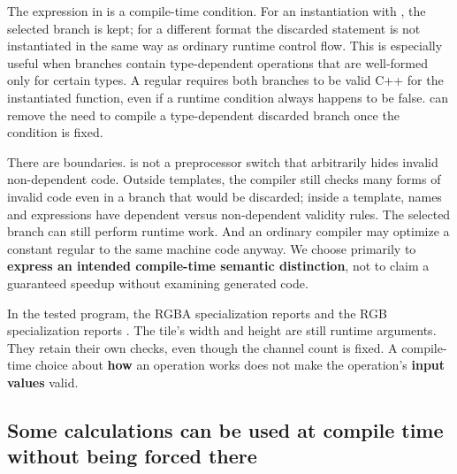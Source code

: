 The expression in  is a compile-time condition. For an instantiation with , the selected branch is kept; for a different format the discarded statement is not instantiated in the same way as ordinary runtime control flow. This is especially useful when branches contain type-dependent operations that are well-formed only for certain types. A regular  requires both branches to be valid C++ for the instantiated function, even if a runtime condition always happens to be false.  can remove the need to compile a type-dependent discarded branch once the condition is fixed.

There are boundaries.  is not a preprocessor switch that arbitrarily hides invalid non-dependent code. Outside templates, the compiler still checks many forms of invalid code even in a branch that would be discarded; inside a template, names and expressions have dependent versus non-dependent validity rules. The selected branch can still perform runtime work. And an ordinary compiler may optimize a constant regular  to the same machine code anyway. We choose  primarily to \textbf{express an intended compile-time semantic distinction}, not to claim a guaranteed speedup without examining generated code.

In the tested program, the RGBA specialization reports  and the RGB specialization reports . The tile's width and height are still runtime arguments. They retain their own checks, even though the channel count is fixed. A compile-time choice about \textbf{how} an operation works does not make the operation's \textbf{input values} valid.

\subsection{Some calculations can be used at compile time without being forced there}\label{01-foundations-i-ch005-some-calculations-can-be-used-at-compile-time-without-being-forced-there}

